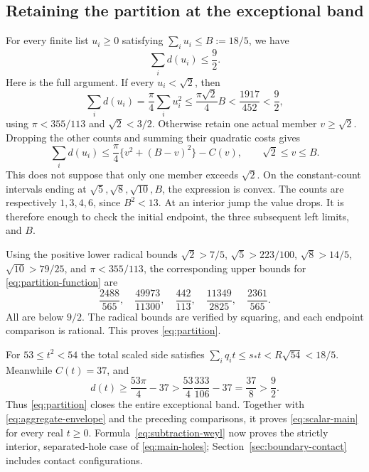 \documentclass[11pt,reqno]{amsart}
\numberwithin{equation}{section}
\newcommand{\sstar}{s_*}
\begin{document}
\subsection*{Retaining the partition at the exceptional band}

For every finite list $u_i\ge0$ satisfying
$\sum_i u_i\le B:=18/5$, we have
\begin{equation}\label{eq:partition}
 \sum_i d(u_i)\le\frac92.
\end{equation}
Here is the full argument. If every $u_i<\sqrt2$, then
\[
 \sum_i d(u_i)=\frac\pi4\sum_i u_i^2
 \le\frac{\pi\sqrt2}{4}B
 <\frac{1917}{452}<\frac92,
\]
using $\pi<355/113$ and $\sqrt2<3/2$. Otherwise retain one
actual member $v\ge\sqrt2$. Dropping the other counts and
summing their quadratic costs gives
\begin{equation}\label{eq:partition-function}
 \sum_i d(u_i)\le
 \frac\pi4\{v^2+(B-v)^2\}-C(v),\qquad\sqrt2\le v\le B.
\end{equation}
This does not suppose that only one member exceeds $\sqrt2$.
On the constant-count intervals ending at
$\sqrt5,\sqrt8,\sqrt{10},B$, the expression is convex.
The counts are respectively $1,3,4,6$, since $B^2<13$.
At an interior jump the value drops. It is therefore enough
to check the initial endpoint, the three subsequent left
limits, and $B$.

Using the positive lower radical bounds
$\sqrt2>7/5$, $\sqrt5>223/100$, $\sqrt8>14/5$,
$\sqrt{10}>79/25$, and $\pi<355/113$, the corresponding
upper bounds for \eqref{eq:partition-function} are
\begin{equation}\label{eq:partition-endpoints}
 \frac{2488}{565},\quad\frac{49973}{11300},\quad
 \frac{442}{113},\quad\frac{11349}{2825},\quad
 \frac{2361}{565}.
\end{equation}
All are below $9/2$. The radical bounds are verified by
squaring, and each endpoint comparison is rational. This
proves \eqref{eq:partition}.

For $53\le t^2<54$ the total scaled side satisfies
$\sum_i q_it\le\sstar t<R\sqrt{54}<18/5$.
Meanwhile $C(t)=37$, and
\begin{equation}\label{eq:53-close}
 d(t)\ge\frac{53\pi}{4}-37
 >\frac{53}{4}\frac{333}{106}-37
 =\frac{37}{8}>\frac92.
\end{equation}
Thus \eqref{eq:partition} closes the entire exceptional band.
Together with \eqref{eq:aggregate-envelope} and the preceding
comparisons, it proves \eqref{eq:scalar-main} for every real
$t\ge0$. Formula~\eqref{eq:subtraction-weyl} now proves the
strictly interior, separated-hole case of \eqref{eq:main-holes};
Section~\ref{sec:boundary-contact} includes contact configurations.
\end{document}
